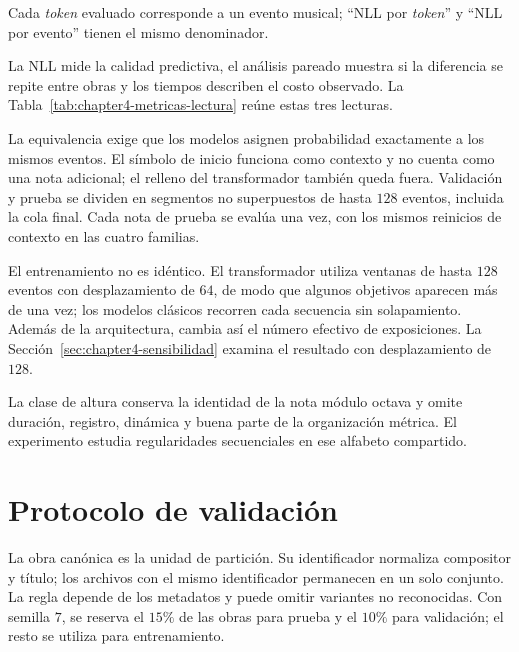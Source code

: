 Cada \emph{token} evaluado corresponde a un evento musical; ``NLL por \emph{token}'' y ``NLL por evento'' tienen el mismo denominador.

La NLL mide la calidad predictiva, el análisis pareado muestra si la diferencia se repite entre obras y los tiempos describen el costo observado. La Tabla~\ref{tab:chapter4-metricas-lectura} reúne estas tres lecturas.

\begin{table}[H]
\centering
\small
\setlength{\tabcolsep}{5pt}

\caption{Lectura de las métricas utilizadas en la comparación. Las medidas de predicción determinan qué modelo asigna más probabilidad a las notas de prueba; las de costo se interpretan por separado.}
\label{tab:chapter4-metricas-lectura}
\end{table}

La equivalencia exige que los modelos asignen probabilidad exactamente a los mismos eventos. El símbolo de inicio funciona como contexto y no cuenta como una nota adicional; el relleno del transformador también queda fuera. Validación y prueba se dividen en segmentos no superpuestos de hasta $128$ eventos, incluida la cola final. Cada nota de prueba se evalúa una vez, con los mismos reinicios de contexto en las cuatro familias.

El entrenamiento no es idéntico. El transformador utiliza ventanas de hasta $128$ eventos con desplazamiento de $64$, de modo que algunos objetivos aparecen más de una vez; los modelos clásicos recorren cada secuencia sin solapamiento. Además de la arquitectura, cambia así el número efectivo de exposiciones. La Sección~\ref{sec:chapter4-sensibilidad} examina el resultado con desplazamiento de $128$.

La clase de altura conserva la identidad de la nota módulo octava y omite duración, registro, dinámica y buena parte de la organización métrica. El experimento estudia regularidades secuenciales en ese alfabeto compartido.

\section{Protocolo de validación}

La obra canónica es la unidad de partición. Su identificador normaliza compositor y título; los archivos con el mismo identificador permanecen en un solo conjunto. La regla depende de los metadatos y puede omitir variantes no reconocidas. Con semilla $7$, se reserva el $15\%$ de las obras para prueba y el $10\%$ para validación; el resto se utiliza para entrenamiento.

